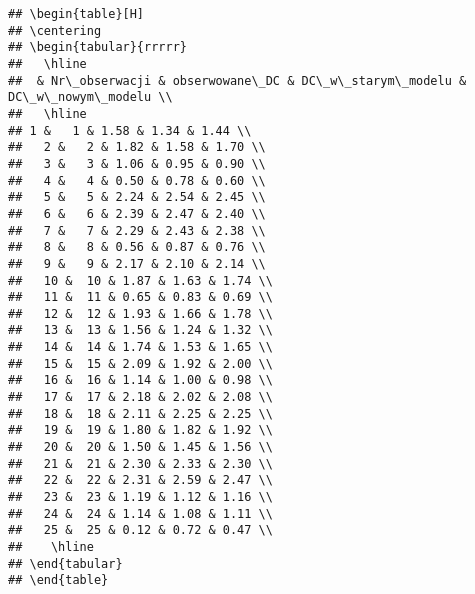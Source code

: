 \documentclass[
  12pt,
]{article}
\begin{document}
\begin{verbatim}
## \begin{table}[H]
## \centering
## \begin{tabular}{rrrrr}
##   \hline
##  & Nr\_obserwacji & obserwowane\_DC & DC\_w\_starym\_modelu & DC\_w\_nowym\_modelu \\ 
##   \hline
## 1 &   1 & 1.58 & 1.34 & 1.44 \\ 
##   2 &   2 & 1.82 & 1.58 & 1.70 \\ 
##   3 &   3 & 1.06 & 0.95 & 0.90 \\ 
##   4 &   4 & 0.50 & 0.78 & 0.60 \\ 
##   5 &   5 & 2.24 & 2.54 & 2.45 \\ 
##   6 &   6 & 2.39 & 2.47 & 2.40 \\ 
##   7 &   7 & 2.29 & 2.43 & 2.38 \\ 
##   8 &   8 & 0.56 & 0.87 & 0.76 \\ 
##   9 &   9 & 2.17 & 2.10 & 2.14 \\ 
##   10 &  10 & 1.87 & 1.63 & 1.74 \\ 
##   11 &  11 & 0.65 & 0.83 & 0.69 \\ 
##   12 &  12 & 1.93 & 1.66 & 1.78 \\ 
##   13 &  13 & 1.56 & 1.24 & 1.32 \\ 
##   14 &  14 & 1.74 & 1.53 & 1.65 \\ 
##   15 &  15 & 2.09 & 1.92 & 2.00 \\ 
##   16 &  16 & 1.14 & 1.00 & 0.98 \\ 
##   17 &  17 & 2.18 & 2.02 & 2.08 \\ 
##   18 &  18 & 2.11 & 2.25 & 2.25 \\ 
##   19 &  19 & 1.80 & 1.82 & 1.92 \\ 
##   20 &  20 & 1.50 & 1.45 & 1.56 \\ 
##   21 &  21 & 2.30 & 2.33 & 2.30 \\ 
##   22 &  22 & 2.31 & 2.59 & 2.47 \\ 
##   23 &  23 & 1.19 & 1.12 & 1.16 \\ 
##   24 &  24 & 1.14 & 1.08 & 1.11 \\ 
##   25 &  25 & 0.12 & 0.72 & 0.47 \\ 
##    \hline
## \end{tabular}
## \end{table}
\end{verbatim}
\end{document}
